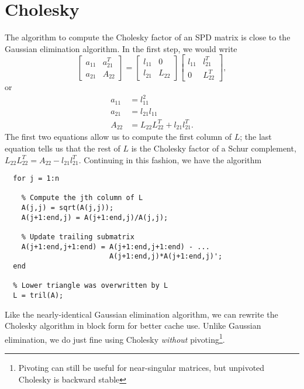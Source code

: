 \documentclass[12pt, leqno]{article} %
\begin{document}
\section{Cholesky}

The algorithm to compute the Cholesky factor of an SPD matrix is
close to the Gaussian elimination algorithm.  In the first step,
we would write
\[
  \begin{bmatrix}
    a_{11} & a_{21}^T \\
    a_{21} & A_{22}
  \end{bmatrix} =
  \begin{bmatrix}
    l_{11} & 0 \\
    l_{21} & L_{22}
  \end{bmatrix}
  \begin{bmatrix}
    l_{11} & l_{21}^T \\
        0 & L_{22}^T
  \end{bmatrix},
\]
or
\begin{align*}
  a_{11} &= l_{11}^2 \\
  a_{21} &= l_{21} l_{11} \\
  A_{22} &= L_{22} L_{22}^T + l_{21} l_{21}^T.
\end{align*}
The first two equations allow us to compute the first column of $L$;
the last equation tells us that the rest of $L$ is the Cholesky factor
of a Schur complement, $L_{22} L_{22}^T = A_{22} - l_{21} l_{21}^T$.
Continuing in this fashion, we have the algorithm
\begin{lstlisting}
  for j = 1:n

    % Compute the jth column of L
    A(j,j) = sqrt(A(j,j));
    A(j+1:end,j) = A(j+1:end,j)/A(j,j);

    % Update trailing submatrix
    A(j+1:end,j+1:end) = A(j+1:end,j+1:end) - ...
                         A(j+1:end,j)*A(j+1:end,j)';
  end

  % Lower triangle was overwritten by L
  L = tril(A);
\end{lstlisting}
Like the nearly-identical Gaussian elimination algorithm, we can
rewrite the Cholesky algorithm in block form for better cache use.
Unlike Gaussian elimination, we do just fine using Cholesky {\em without}
pivoting\footnote{Pivoting can still be useful for near-singular matrices,
but unpivoted Cholesky is backward stable}.
\end{document}
